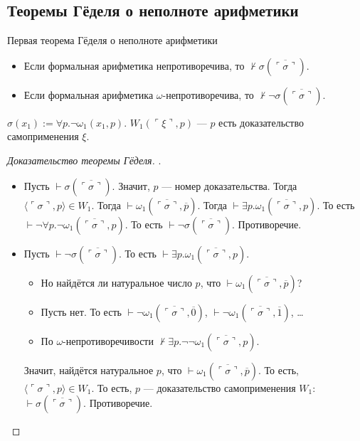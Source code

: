 \subsection{Теоремы Гёделя о неполноте арифметики}


\begin{theorem}{Первая теорема Гёделя о неполноте арифметики}
    \begin{itemize}
    \item Если формальная арифметика непротиворечива, то $\not\vdash\sigma(\overline{\ulcorner\sigma\urcorner})$.
    \item Если формальная арифметика $\omega$-непротиворечива, то $\not\vdash\neg\sigma(\overline{\ulcorner\sigma\urcorner})$.
    \end{itemize}
\end{theorem}


\begin{note}
    $\sigma(x_1) := \forall p.\neg\omega_1(x_1,p)$. $W_1(\ulcorner\xi\urcorner,p)$ --- $p$ есть доказательство самоприменения $\xi$.
\end{note}

\begin{proof}[Доказательство теоремы Гёделя].
\begin{itemize}
\item Пусть $\vdash\sigma(\overline{\ulcorner\sigma\urcorner})$. Значит, $p$ --- номер доказательства.  Тогда
$\langle\ulcorner\sigma\urcorner,p\rangle \in W_1$.  Тогда $\vdash\omega_1(\overline{\ulcorner\sigma\urcorner},\overline{p})$.
Тогда $\vdash\exists p.\omega_1(\overline{\ulcorner\sigma\urcorner},p)$.  То есть
$\vdash\neg\forall p.\neg\omega_1(\overline{\ulcorner\sigma\urcorner},p)$.  То есть $\vdash\neg\sigma(\overline{\ulcorner\sigma\urcorner})$. Противоречие.

\item Пусть $\vdash\neg\sigma(\overline{\ulcorner\sigma\urcorner})$.  То есть $\vdash\exists p.\omega_1(\overline{\ulcorner\sigma\urcorner},p)$.
\begin{itemize}
\item
 Но найдётся ли натуральное число $p$, что $\vdash\omega_1(\overline{\ulcorner\sigma\urcorner},\overline{p})$?

\item Пусть нет. То есть $\vdash\neg\omega_1(\overline{\ulcorner\sigma\urcorner},\overline{0})$, $\vdash\neg\omega_1(\overline{\ulcorner\sigma\urcorner},\overline{1})$, \dots

\item По $\omega$-непротиворечивости $\not\vdash\exists p.\neg\neg\omega_1(\overline{\ulcorner\sigma\urcorner},p)$.
\end{itemize}
       Значит, найдётся натуральное $p$, что $\vdash\omega_1(\overline{\ulcorner\sigma\urcorner},\overline{p})$.
То есть, $\langle\ulcorner\sigma\urcorner, p\rangle\in W_1$.
То есть, $p$ --- доказательство самоприменения $W_1$: $\vdash\sigma(\overline{\ulcorner\sigma\urcorner})$.  Противоречие.
\end{itemize}
\end{proof}


